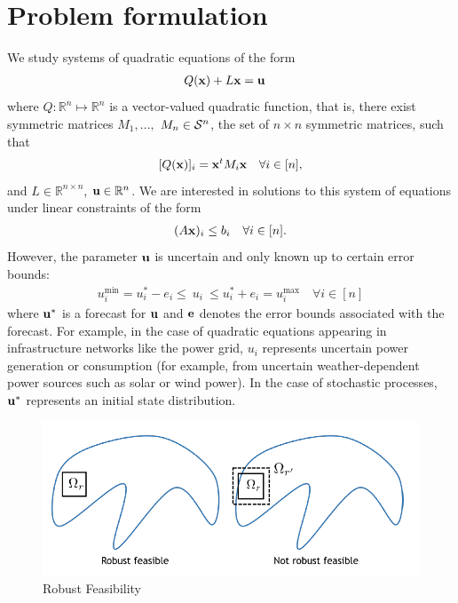 \section{Problem formulation} \label{sec:probform}


We study systems of quadratic equations of the form
\begin{align}
& Q(\bold x)+L\bold x=\bold u\label{eq:Quad}
\end{align}
where $Q: \mathbb{R}^n \mapsto \mathbb{R}^n$ is a vector-valued quadratic function, that is, there exist symmetric matrices $M_1,\dots,$ $M_{n} \in \mathcal{S}^{n}$, the set of $n \times n$ symmetric matrices, such that
\[[Q(\bold x)]_i = \bold x^t M_{i} \bold x \quad \forall i \in [n],\]
and $L \in \mathbb{R}^{n\times n}$, $\bold u \in \mathbb{R}^n$. 
We are interested in solutions to this system of equations under linear constraints of the form
\begin{align}
(A\bold x)_i\leq b_i \quad \forall i \in [n]. \label{eq:xLimits}
\end{align}
However, the parameter $\bold u$ is uncertain and only known up to certain error bounds:
\begin{align}
u^{\min}_i=u_i^*-e_i \leq ~u_i~ \leq u_i^*+e_i=u^{\max}_i \quad \forall i \in [n] \label{eq:uLimits}
\end{align}
where $\bold u^*$ is a forecast for $\bold u$ and $\bold e$ denotes the error bounds associated with the forecast. 
For example, in the case of quadratic equations appearing in infrastructure networks like the power grid, $u_i$ represents uncertain power generation or consumption (for example, from uncertain weather-dependent power sources such as solar or wind power). 
In the case of stochastic processes, $\bold u^*$ represents an initial state distribution.

\begin{figure}
\begin{center}
\includegraphics[scale=0.5]{Figures/Rfeas}
\end{center}
\caption{Robust Feasibility}
\label{fig:RFeas}
\end{figure}

